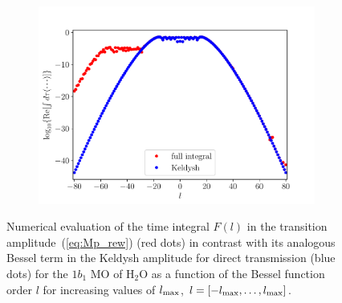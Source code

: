 \begin{figure}
\begin{subfigure}[b]{0.33\linewidth}
    \includegraphics[width=\textwidth]{figures/ch_ATI_SFA/1b1/l80n512WP50PG25MR35vsKeldysh.pdf}
  \end{subfigure}
  \caption{Numerical evaluation of the time integral $F(l)$ in the
    transition amplitude~(\ref{eq:Mp_rew}) (red dots) in contrast with
    its analogous Bessel term in the Keldysh amplitude for direct
    transmission (blue dots) for the $1b_{1}$ MO of H$_{2}$O as a
    function of the Bessel function order $l$ for increasing values of
    $l_{\rm{max}}$, $l=[ -l_{\rm{max}} , \dots, l_{\rm{max}}]$.}
    \label{fig:1b1_vs_keldysh}
\end{figure}


